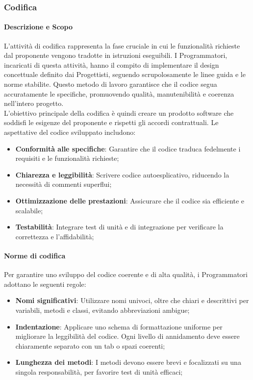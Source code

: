 \documentclass[10pt]{article}
\begin{document}
\begin{justify}
    \subsubsection{Codifica}

        \paragraph{Descrizione e Scopo}
        L’attività di codifica rappresenta la fase cruciale in cui le funzionalità richieste dal proponente vengono tradotte in istruzioni eseguibili. I Programmatori, incaricati di questa attività, hanno il compito di implementare il design concettuale definito dai Progettisti, seguendo scrupolosamente le linee guida e le norme stabilite. Questo metodo di lavoro garantisce che il codice segua accuratamente le specifiche, promuovendo qualità, manutenibilità e coerenza nell'intero progetto.\\
        L’obiettivo principale della codifica è quindi creare un prodotto software che soddisfi le esigenze del proponente e rispetti gli accordi contrattuali. Le aspettative del codice sviluppato includono:
        \begin{itemize}
            \item \textbf{Conformità alle specifiche}: Garantire che il codice traduca fedelmente i requisiti e le funzionalità richieste;
            \item \textbf{Chiarezza e leggibilità}: Scrivere codice autoesplicativo, riducendo la necessità di commenti superflui;
            \item \textbf{Ottimizzazione delle prestazioni}: Assicurare che il codice sia efficiente e scalabile;
            \item \textbf{Testabilità}: Integrare test di unità e di integrazione per verificare la correttezza e l’affidabilità;
        \end{itemize}

        \paragraph{Norme di codifica}
        Per garantire uno sviluppo del codice coerente e di alta qualità, i Programmatori adottano le seguenti regole:
        \begin{itemize}
            \item \textbf{Nomi significativi}: Utilizzare nomi univoci, oltre che chiari e descrittivi per variabili, metodi e classi, evitando abbreviazioni ambigue;
            \item \textbf{Indentazione}: Applicare uno schema di formattazione uniforme per migliorare la leggibilità del codice. Ogni livello di annidamento deve essere chiaramente separato con un tab o spazi coerenti;
            \item \textbf{Lunghezza dei metodi}: I metodi devono essere brevi e focalizzati su una singola responsabilità, per favorire test di unità efficaci;
        \end{itemize}


\end{justify}
\end{document}
